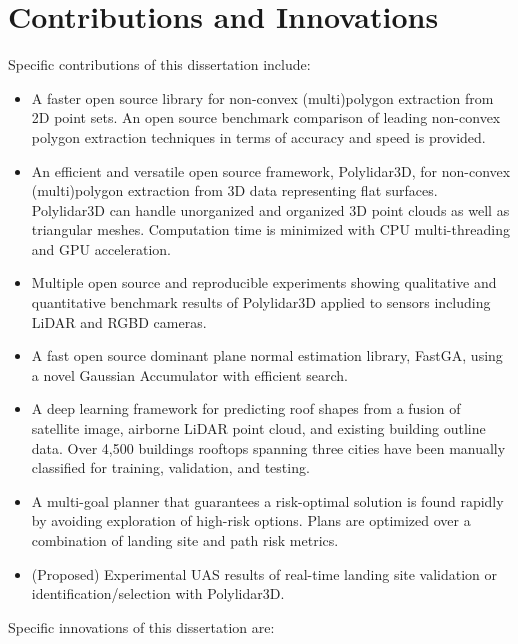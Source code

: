 \section{Contributions and Innovations}
Specific contributions of this dissertation include: %

\begin{itemize}[noitemsep]
  \item A faster open source library for non-convex (multi)polygon extraction from 2D point sets. An open source benchmark comparison of leading non-convex polygon extraction techniques in terms of accuracy and speed is provided. %
  \item An efficient and versatile open source framework, Polylidar3D,  for non-convex (multi)polygon extraction from 3D data representing flat surfaces. Polylidar3D can handle unorganized and organized 3D point clouds as well as triangular meshes. Computation time is minimized with CPU multi-threading and GPU acceleration. %
  \item Multiple open source and reproducible experiments showing qualitative and quantitative benchmark results of Polylidar3D applied to sensors including LiDAR and RGBD cameras.
  \item A fast open source dominant plane normal estimation library, FastGA,  using a novel Gaussian Accumulator with efficient search.
  \item A deep learning framework for predicting roof shapes from a fusion of satellite image, airborne LiDAR point cloud, and existing building outline data. Over 4,500 buildings rooftops spanning three cities have been manually classified  for training, validation, and testing.
  \item A multi-goal planner that guarantees a risk-optimal solution is found rapidly by avoiding exploration of high-risk options. Plans are optimized over a combination of landing site and path risk metrics.
  \item (Proposed) Experimental UAS results of real-time landing site validation or identification/selection with Polylidar3D.
\end{itemize}
 
Specific innovations of this dissertation are: %

